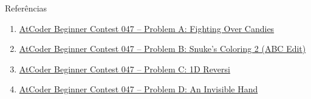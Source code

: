 \begin{frame}[fragile]{Referências}

    \begin{enumerate}
        \item \href{https://atcoder.jp/contests/abc046/tasks/abc047_a}{AtCoder Beginner Contest 
            047 -- Problem A: Fighting Over Candies}

        \item \href{https://atcoder.jp/contests/abc046/tasks/abc047_b}{AtCoder Beginner Contest 
            047 -- Problem B: Snuke's Coloring 2 (ABC Edit)}

        \item \href{https://atcoder.jp/contests/abc046/tasks/arc063_a}{AtCoder Beginner Contest
            047 -- Problem C: 1D Reversi}

        \item \href{https://atcoder.jp/contests/abc046/tasks/arc063_b}{AtCoder Beginner Contest
            047 -- Problem D: An Invisible Hand}
    \end{enumerate}

\end{frame}
